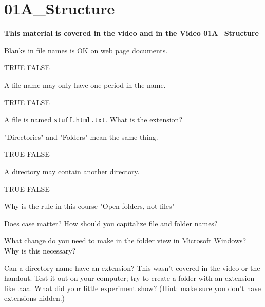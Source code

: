\documentclass[letterpaper,12pt]{exam}
\begin{document}
\section*{01A\_Structure}
\begin{center}
	\textbf{This material is covered in the video and in the Video 01A\_Structure}
\end{center}
\begin{questions}
	
\question Blanks in file names is OK on web page documents.
\begin{checkboxes}
\choice TRUE
\choice FALSE
\end{checkboxes}

\question A file name may only have one period in the name.
\begin{checkboxes}
\choice TRUE
\choice FALSE
\end{checkboxes}

\question A file is named \texttt{stuff.html.txt}.  What is the extension? 
\vspace{1.5cm}

\question "Directories" and "Folders" mean the same thing.
\begin{checkboxes}
\choice TRUE
\choice FALSE
\end{checkboxes}

\question A directory may contain another directory.
\begin{checkboxes}
\choice TRUE
\choice FALSE
\end{checkboxes}

\question Why is the rule in this course "Open folders, not files" 
\vspace{1.5cm}

\question Does case matter?  How should you capitalize file and folder names? 
\vspace{1.5cm}

\question What change do you need to make in the folder view in Microsoft Windows?  Why is this necessary? 
\vspace{1.5cm}

\question Can a directory name have an extension?  This wasn't covered in the video or the handout.  Test it out on your computer; try to create a folder with an extension like .aaa.   What did your little experiment show? (Hint: make sure you don't have extensions hidden.)
\vspace{1.5cm}

\end{questions}
\end{document}
